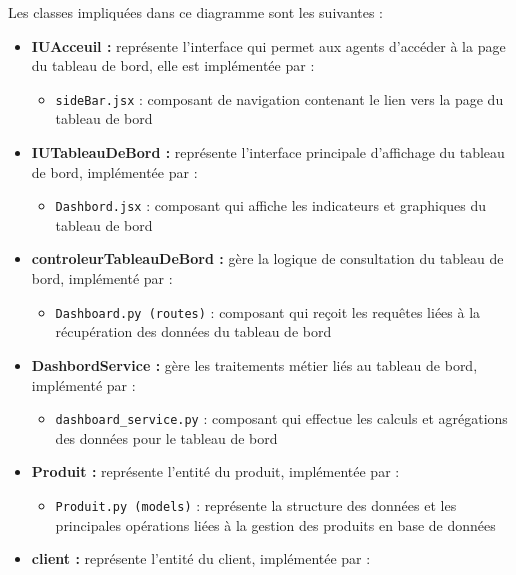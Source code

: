 Les classes impliquées dans ce diagramme sont les suivantes :
\begin{itemize}[leftmargin=2em, topsep=4pt, itemsep=4pt]
  \item \textbf{IUAcceuil :} représente l'interface qui permet aux agents d'accéder à la page du tableau de bord, elle est implémentée par :
  \begin{itemize}[leftmargin=2em, topsep=2pt, itemsep=2pt]
    \item \texttt{sideBar.jsx} : composant de navigation contenant le lien vers la page du tableau de bord
  \end{itemize}
  \item \textbf{IUTableauDeBord :} représente l'interface principale d'affichage du tableau de bord, implémentée par :
  \begin{itemize}[leftmargin=2em, topsep=2pt, itemsep=2pt]
    \item \texttt{Dashbord.jsx} : composant qui affiche les indicateurs et graphiques du tableau de bord
  \end{itemize}
  \item \textbf{controleurTableauDeBord :} gère la logique de consultation du tableau de bord, implémenté par :
  \begin{itemize}[leftmargin=2em, topsep=2pt, itemsep=2pt]
    \item \texttt{Dashboard.py (routes)} : composant qui reçoit les requêtes liées à la récupération des données du tableau de bord
  \end{itemize}
  \item \textbf{DashbordService :} gère les traitements métier liés au tableau de bord, implémenté par :
  \begin{itemize}[leftmargin=2em, topsep=2pt, itemsep=2pt]
    \item \texttt{dashboard\_service.py} : composant qui effectue les calculs et agrégations des données pour le tableau de bord
  \end{itemize}
  \item \textbf{Produit :} représente l'entité du produit, implémentée par :
  \begin{itemize}[leftmargin=2em, topsep=2pt, itemsep=2pt]
    \item \texttt{Produit.py (models)} : représente la structure des données et les principales opérations liées à la gestion des produits en base de données
  \end{itemize}
  \item \textbf{client :} représente l'entité du client, implémentée par :

\end{itemize}
